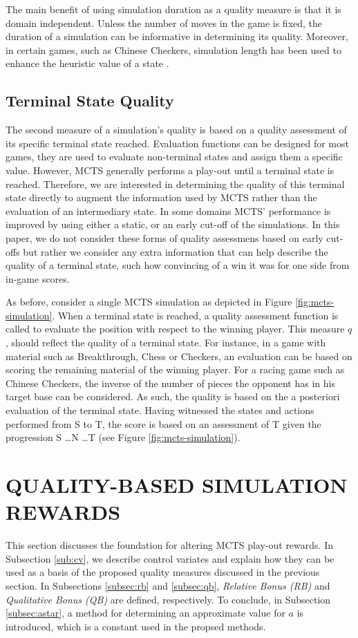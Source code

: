\documentclass{ecai2014}
\newcommand{\node}[1]{{\fontfamily{phv}\selectfont#1}}
\begin{document}
The main benefit of using simulation duration as a quality measure is that it is domain independent. Unless the number of moves in the game is fixed, the duration of a simulation can be informative in determining its quality. Moreover, in certain games, such as Chinese Checkers, simulation length has been used to enhance the heuristic value of a state \cite{roschke2013cc}.

\subsection{Terminal State Quality}
\label{sub:termqual}
The second measure of a simulation's quality is based on a quality assessment of its specific terminal state reached. Evaluation functions can be designed for most games, they are used to evaluate non-terminal states and assign them a specific value. However, MCTS generally performs a play-out until a terminal state is reached. Therefore, we are interested in determining the quality of this terminal state directly to augment the information used by MCTS rather than the evaluation of an intermediary state. In some domains MCTS' performance is improved by using either a static, or an early cut-off of the simulations. In this paper, we do not consider these forms of quality assessmens based on early cut-offs but rather we consider any extra information that can help describe the quality of a terminal state, such how convincing of a win it was for one side from in-game scores. 

As before, consider a single MCTS simulation as depicted in Figure \ref{fig:mcts-simulation}. When a terminal state is reached, a quality assessment function is called to evaluate the position with respect to the winning player. This measure $q$, should reflect the quality of a terminal state. For instance, in a game with material such as Breakthrough, Chess or Checkers, an evaluation can be based on scoring the remaining material of the winning player. For a racing game such as Chinese Checkers, the inverse of the number of pieces the opponent has in his target base can be considered. As such, the quality is based on the a posteriori evaluation of the terminal state. Having witnessed the states and actions performed from \node{S} to \node{T}, the score is based on an assessment of \node{T} given the progression \node{S} \ldots \node{N} \ldots \node{T} (see Figure \ref{fig:mcts-simulation}).

\section{QUALITY-BASED SIMULATION REWARDS}
\label{sec:qoreward}
This section discusses the foundation for altering MCTS play-out rewards. In Subsection \ref{sub:cv}, we describe control variates and explain how they can be used as a basis of the proposed quality measures discussed in the previous section. In Subsections \ref{subsec:rb} and \ref{subsec:qb}, \emph{Relative Bonus (RB)} and \emph{Qualitative Bonus (QB)} are defined, respectively. To conclude, in Subsection \ref{subsec:astar}, a method for determining an approximate value for $a$ is introduced, which is a constant used in the propsed methods.
\end{document}
